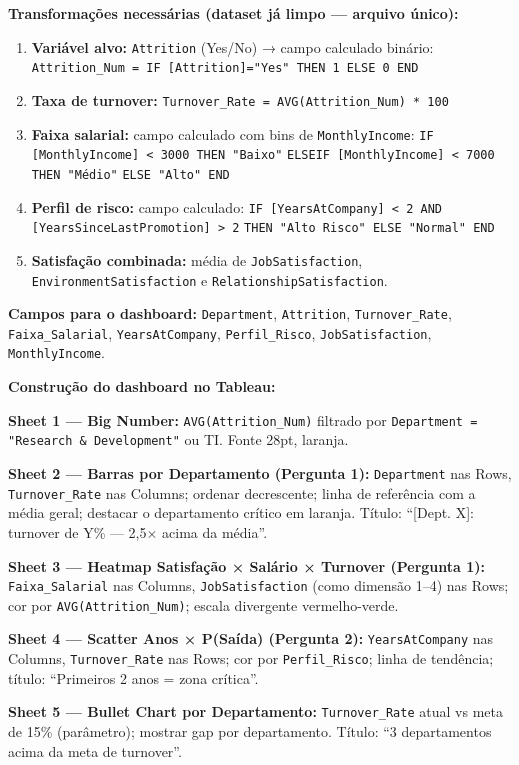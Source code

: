 \begin{SolvedBox}
\textbf{Transformações necessárias (dataset já limpo — arquivo único):}

\begin{enumerate}
  \item \textbf{Variável alvo:} \texttt{Attrition} (Yes/No) → campo calculado binário:
  \texttt{Attrition\_Num = IF [Attrition]="Yes" THEN 1 ELSE 0 END}
  \item \textbf{Taxa de turnover:} \texttt{Turnover\_Rate = AVG(Attrition\_Num) * 100}
  \item \textbf{Faixa salarial:} campo calculado com bins de \texttt{MonthlyIncome}:
  \texttt{IF [MonthlyIncome] < 3000 THEN "Baixo"}
  \texttt{ELSEIF [MonthlyIncome] < 7000 THEN "Médio"}
  \texttt{ELSE "Alto" END}
  \item \textbf{Perfil de risco:} campo calculado:
  \texttt{IF [YearsAtCompany] < 2 AND [YearsSinceLastPromotion] > 2}
  \texttt{THEN "Alto Risco" ELSE "Normal" END}
  \item \textbf{Satisfação combinada:} média de \texttt{JobSatisfaction},
  \texttt{EnvironmentSatisfaction} e \texttt{RelationshipSatisfaction}.
\end{enumerate}

\textbf{Campos para o dashboard:}
\texttt{Department}, \texttt{Attrition}, \texttt{Turnover\_Rate}, \texttt{Faixa\_Salarial},
\texttt{YearsAtCompany}, \texttt{Perfil\_Risco}, \texttt{JobSatisfaction}, \texttt{MonthlyIncome}.
\end{SolvedBox}

\begin{SolvedBox}
\textbf{Construção do dashboard no Tableau:}

\textbf{Sheet 1 — Big Number:} \texttt{AVG(Attrition\_Num)} filtrado por
\texttt{Department = "Research \& Development"} ou TI. Fonte 28pt, laranja.

\textbf{Sheet 2 — Barras por Departamento (Pergunta 1):}
\texttt{Department} nas Rows, \texttt{Turnover\_Rate} nas Columns; ordenar decrescente;
linha de referência com a média geral; destacar o departamento crítico em laranja.
Título: ``[Dept. X]: turnover de Y\% — 2,5$\times$ acima da média''.

\textbf{Sheet 3 — Heatmap Satisfação × Salário × Turnover (Pergunta 1):}
\texttt{Faixa\_Salarial} nas Columns, \texttt{JobSatisfaction} (como dimensão 1–4) nas Rows;
cor por \texttt{AVG(Attrition\_Num)}; escala divergente vermelho-verde.

\textbf{Sheet 4 — Scatter Anos × P(Saída) (Pergunta 2):}
\texttt{YearsAtCompany} nas Columns, \texttt{Turnover\_Rate} nas Rows; cor por
\texttt{Perfil\_Risco}; linha de tendência; título: ``Primeiros 2 anos = zona crítica''.

\textbf{Sheet 5 — Bullet Chart por Departamento:}
\texttt{Turnover\_Rate} atual vs meta de 15\% (parâmetro); mostrar gap por
departamento. Título: ``3 departamentos acima da meta de turnover''.
\end{SolvedBox}


